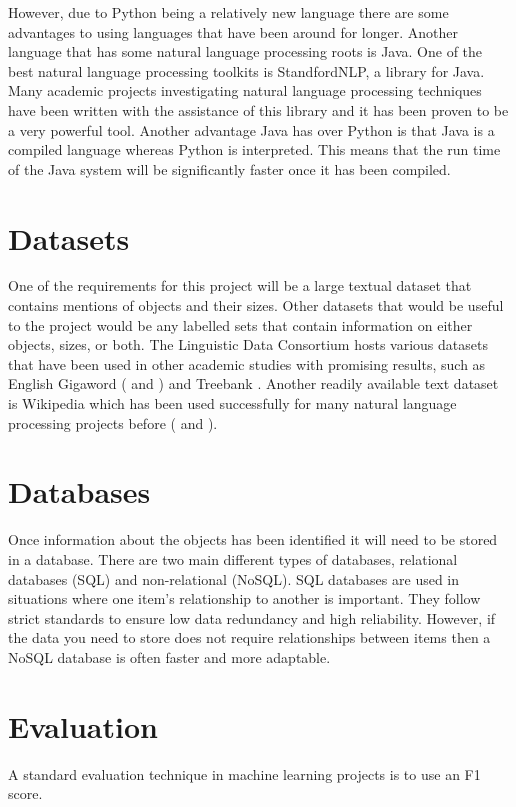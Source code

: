 \documentclass[11pt,oneside]{book}
\begin{document}
However, due to Python being a relatively new language there are some advantages to using languages that have been around for longer. Another language that has some natural language processing roots is Java. One of the best natural language processing toolkits is StandfordNLP, a library for Java. Many academic projects investigating natural language processing techniques have been written with the assistance of this library and it has been proven to be a very powerful tool. Another advantage Java has over Python is that Java is a compiled language whereas Python is interpreted. This means that the run time of the Java system will be significantly faster once it has been compiled.

\section{Datasets}

One of the requirements for this project will be a large textual dataset that contains mentions of objects and their sizes. Other datasets that would be useful to the project would be any labelled sets that contain information on either objects, sizes, or both. The Linguistic Data Consortium hosts various datasets that have been used in other academic studies with promising results, such as English Gigaword (\cite{gigaword_one} and \cite{gigaword_two}) and Treebank \citep{treebank}. Another readily available text dataset is Wikipedia which has been used successfully for many natural language processing projects before (\cite{wiki_nlp} and \cite{wiki_nlp_two}).

\section{Databases}

Once information about the objects has been identified it will need to be stored in a database. There are two main different types of databases, relational databases (SQL) and non-relational (NoSQL). SQL databases are used in situations where one item's relationship to another is important. They follow strict standards to ensure low data redundancy and high reliability. However, if the data you need to store does not require relationships between items then a NoSQL database is often faster and more adaptable. 

\section{Evaluation}
A standard evaluation technique in machine learning projects is to use an F1 score.
\end{document}
